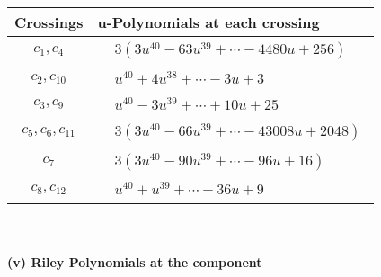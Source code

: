 \documentclass[1p]{elsarticle_modified}
\theoremstyle{definition}
\begin{document}
\begin{tabular}{m{50pt}|m{274pt}}
Crossings & \hspace{64pt}u-Polynomials at each crossing \\
\hline $$\begin{aligned}c_{1},c_{4}\end{aligned}$$&$\begin{aligned}
&3(3 u^{40}-63 u^{39}+\cdots-4480 u+256)
\end{aligned}$\\
\hline $$\begin{aligned}c_{2},c_{10}\end{aligned}$$&$\begin{aligned}
&u^{40}+4 u^{38}+\cdots-3 u+3
\end{aligned}$\\
\hline $$\begin{aligned}c_{3},c_{9}\end{aligned}$$&$\begin{aligned}
&u^{40}-3 u^{39}+\cdots+10 u+25
\end{aligned}$\\
\hline $$\begin{aligned}c_{5},c_{6},c_{11}\end{aligned}$$&$\begin{aligned}
&3(3 u^{40}-66 u^{39}+\cdots-43008 u+2048)
\end{aligned}$\\
\hline $$\begin{aligned}c_{7}\end{aligned}$$&$\begin{aligned}
&3(3 u^{40}-90 u^{39}+\cdots-96 u+16)
\end{aligned}$\\
\hline $$\begin{aligned}c_{8},c_{12}\end{aligned}$$&$\begin{aligned}
&u^{40}+u^{39}+\cdots+36 u+9
\end{aligned}$\\
\hline
\end{tabular}\\~\\
\newpage\renewcommand{\arraystretch}{1}
\flushleft \textbf{(v) Riley Polynomials at the component}\newline \\
\end{document}
